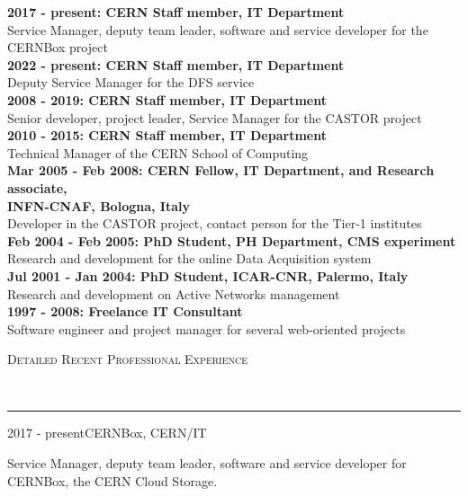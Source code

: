 \documentclass[11pt]{article}
\renewcommand{\section}[2]%
        {\vspace{1.3\baselineskip}%
         \hspace{0in}%
         {\raggedright \scshape #1}\\[-0.15\baselineskip]%
                 \rule{\columnwidth}{1pt}%
        \vspace{.5\baselineskip}%
         \hspace{0in}
}
\renewcommand{\subsection}[2]%
        {
         {\bf{\raggedright \scshape #1}}{\bf{\hfill \scshape #2}}\\[-.7\baselineskip]
}
\begin{document}
\textbf{2017 - present: CERN Staff member, IT Department}\\
Service Manager, deputy team leader, software and service developer for the CERNBox project\\[.3\baselineskip]
\textbf{2022 - present: CERN Staff member, IT Department}\\
Deputy Service Manager for the DFS service\\[.3\baselineskip]
\textbf{2008 - 2019: CERN Staff member, IT Department}\\
Senior developer, project leader, Service Manager for the CASTOR project\\[.3\baselineskip]
\textbf{2010 - 2015: CERN Staff member, IT Department}\\
Technical Manager of the CERN School of Computing\\[.3\baselineskip]
\textbf{Mar 2005 - Feb 2008: CERN Fellow, IT Department, and Research associate,\\ INFN-CNAF, Bologna, Italy}\\
Developer in the CASTOR project, contact person for the Tier-1 institutes\\[.3\baselineskip]
\textbf{Feb 2004 - Feb 2005: PhD Student, PH Department, CMS experiment}\\
Research and development for the online Data Acquisition system\\[.3\baselineskip]
\textbf{Jul 2001 - Jan 2004: PhD Student, ICAR-CNR, Palermo, Italy}\\
Research and development on Active Networks management\\[.3\baselineskip]
\textbf{1997 - 2008: Freelance IT Consultant}\\
Software engineer and project manager for several web-oriented projects


\section{Detailed Recent Professional Experience}

\subsection{2017 - present}{CERNBox, CERN/IT}

Service Manager, deputy team leader, software and service developer for CERNBox, the CERN Cloud Storage.
\end{document}
